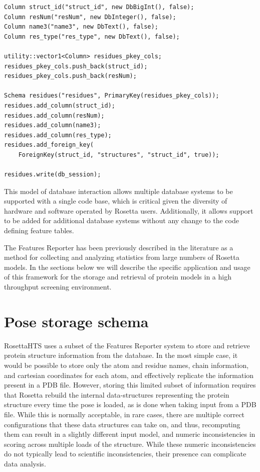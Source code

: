 \singlespace
\begin{Verbatim}
Column struct_id("struct_id", new DbBigInt(), false);
Column resNum("resNum", new DbInteger(), false);
Column name3("name3", new DbText(), false);
Column res_type("res_type", new DbText(), false);

utility::vector1<Column> residues_pkey_cols;
residues_pkey_cols.push_back(struct_id);
residues_pkey_cols.push_back(resNum);

Schema residues("residues", PrimaryKey(residues_pkey_cols));
residues.add_column(struct_id);
residues.add_column(resNum);
residues.add_column(name3);
residues.add_column(res_type);
residues.add_foreign_key(
	ForeignKey(struct_id, "structures", "struct_id", true));

residues.write(db_session);
\end{Verbatim}
\doublespace

This model of database interaction allows multiple database systems to be supported with a single code base, which is critical given the diversity of hardware and software operated by Rosetta users.
Additionally, it allows support to be added for additional database systems without any change to the code defining feature tables. 

The Features Reporter has been previously described in the literature\citep{LeaverFay:2013fn} as a method for collecting and analyzing statistics from large numbers of Rosetta models.  
In the sections below we will describe the specific application and usage of this framework for the storage and retrieval of protein models in a high throughput screening environment. 

\section{Pose storage schema}

RosettaHTS uses a subset of the Features Reporter system to store and retrieve protein structure information from the database.
In the most simple case, it would be possible to store only the atom and residue names, chain information, and cartesian coordinates for each atom, and effectively replicate the information present in a PDB file.
However, storing this limited subset of information requires that Rosetta rebuild the internal data-structures representing the protein structure every time the pose is loaded, as is done when taking input from a PDB file.
While this is normally acceptable, in rare cases, there are multiple correct configurations that these data structures can take on, and thus, recomputing them can result in a slightly different input model, and numeric inconsistencies in scoring across multiple loads of the structure.
While these  numeric inconsistencies do not typically lead to scientific inconsistencies, their presence can complicate data analysis.

